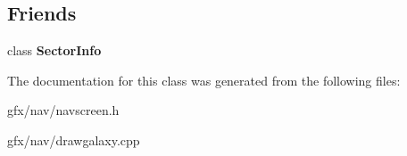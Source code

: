 \subsection*{Friends}
\begin{DoxyCompactItemize}
\item 
class {\bfseries Sector\+Info}\hypertarget{classNavigationSystem_1_1CachedSectorIterator_a62bc299e024ae79c0e86a3f0f883ae33}{}\label{classNavigationSystem_1_1CachedSectorIterator_a62bc299e024ae79c0e86a3f0f883ae33}

\end{DoxyCompactItemize}


The documentation for this class was generated from the following files\+:\begin{DoxyCompactItemize}
\item 
gfx/nav/navscreen.\+h\item 
gfx/nav/drawgalaxy.\+cpp\end{DoxyCompactItemize}
